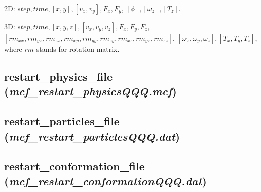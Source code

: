 \documentclass[a4paper,10pt]{article}
\begin{document}
2D:
\textbf{$step, time, [x, y], [v_x, v_y],
F_x, F_y$},
\textbf{$[\phi],[\omega_z], 
[T_z]$}.

3D:
\textbf{$step, time, [x, y, z], [v_x, v_y, v_z],
F_x, F_y, F_z$},\\
\textbf{$[rm_{xx},rm_{yx},rm_{zx},rm_{xy},rm_{yy},rm_{zy},rm_{xz},rm_{yz},rm_{zz}]$},
\textbf{$[\omega_x, \omega_y, \omega_z],[T_x, T_y, T_z]$},
where $rm$ stands for rotation matrix.

\subsection{\textbf{restart\_physics\_file}\\
(\textit{mcf\_restart\_physicsQQQ.mcf})}


\subsection{\textbf{restart\_particles\_file}\\
(\textit{mcf\_restart\_particlesQQQ.dat})}


\subsection{\textbf{restart\_conformation\_file}\\
(\textit{mcf\_restart\_conformationQQQ.dat})}



\end{document}
